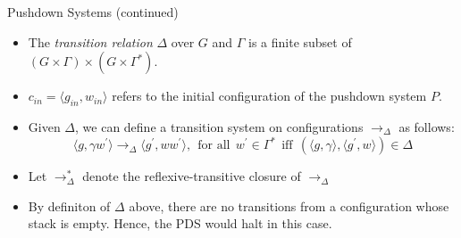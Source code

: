 \documentclass[10pt,notheorems]{beamer}
\theoremstyle{plain} %
\begin{document}
\begin{frame}{Pushdown Systems (continued)}
    \begin{itemize}
        \item The \textit{transition relation} $\Delta$ over $G$ and $\Gamma$ is a finite subset
        of $(G\times \Gamma)\times(G\times \Gamma^*)$.
        \item $c_{in}=\langle g_{in},w_{in}\rangle$ refers to the initial configuration of 
        the pushdown system $P$.
        \item Given $\Delta$, we can define a transition system on configurations $\rightarrow_{\Delta}$ as follows:\\
        \[\langle g,\gamma w^{\prime} \rangle \rightarrow_{\Delta} \langle g^{\prime},ww^{\prime}\rangle,
        \:\:\text{for all}\:\:w^{\prime}\in \Gamma^*\:\:\text{iff}\:\:(\langle g,\gamma\rangle,\langle g^{\prime},w\rangle)\in \Delta\]
        \item Let $\rightarrow^*_{\Delta}$ denote the reflexive-transitive closure of $\rightarrow_{\Delta}$
        \item By definiton of $\Delta$ above, there are no transitions from a configuration whose stack is empty.
        Hence, the PDS would halt in this case.
    \end{itemize}
\end{frame}
\end{document}
